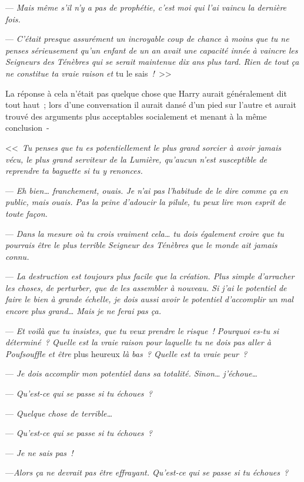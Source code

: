 --- \emph{Mais même s'il n'y a pas de prophétie, c'est moi qui l'ai vaincu la dernière fois.}

--- \emph{C'était presque assurément un incroyable coup de chance à moins que tu ne penses sérieusement qu'un enfant de un an avait une capacité innée à vaincre les Seigneurs des Ténèbres qui se serait maintenue dix ans plus tard. Rien de tout ça ne constitue ta vraie raison et} tu le sais\emph{~!}~>>

La réponse à cela n'était pas quelque chose que Harry aurait généralement dit tout haut~; lors d'une conversation il aurait dansé d'un pied sur l'autre et aurait trouvé des arguments plus acceptables socialement et menant à la même conclusion~-

<<~\emph{Tu penses que tu es potentiellement le plus grand sorcier à avoir jamais vécu, le plus grand serviteur de la Lumière, qu'aucun n'est susceptible de reprendre ta baguette si tu y renonces.}

--- \emph{Eh bien… franchement, ouais. Je n'ai pas l'habitude de le dire comme ça en public, mais ouais. Pas la peine d'adoucir la pilule, tu peux lire mon esprit de toute façon.}

--- \emph{Dans la mesure où tu crois vraiment cela… tu dois également croire que tu pourrais être le plus terrible Seigneur des Ténèbres que le monde ait jamais connu.}

--- \emph{La destruction est toujours plus facile que la création. Plus simple d'arracher les choses, de perturber, que de les assembler à nouveau. Si j'ai le potentiel de faire le bien à grande échelle, je dois aussi avoir le potentiel d'accomplir un mal encore plus grand… Mais je ne ferai pas ça.}

--- \emph{Et voilà que tu insistes, que tu veux prendre le risque~! Pourquoi es-tu si déterminé~? Quelle est la vraie raison pour laquelle tu ne dois pas aller à Poufsouffle et être} plus heureux \emph{là bas~? Quelle est ta vraie peur~?}

--- \emph{Je dois accomplir mon potentiel dans sa totalité. Sinon… j'échoue…}

--- \emph{Qu'est-ce qui se passe si tu échoues~?}

--- \emph{Quelque chose de terrible…}

--- \emph{Qu'est-ce qui se passe si tu échoues~?}

--- \emph{Je ne sais pas~!}

---\emph{Alors ça ne devrait pas être effrayant. Qu'est-ce qui se passe si tu échoues~?}


